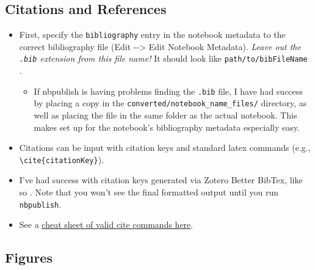 \documentclass[10pt,parskip=half,
	toc=sectionentrywithdots,
	bibliography=totocnumbered,
	captions=tableheading,
    numbers=noendperiod,
    headings=standardclasses]{scrartcl}
\providecommand{\tightlist}{%
  \setlength{\itemsep}{0pt}\setlength{\parskip}{0pt}}
\begin{document}

\subsection{Citations and References}\label{citations-and-references}

\begin{itemize}
\tightlist
\item
  First, specify the \texttt{bibliography} entry in the notebook
  metadata to the correct bibliography file (Edit -\/-\textgreater{}
  Edit Notebook Metadata). \emph{Leave out the \texttt{.bib} extension
  from this file name!} It should look like \texttt{path/to/bibFileName}
  .

  \begin{itemize}
  \tightlist
  \item
    If nbpublish is having problems finding the \texttt{.bib} file, I
    have had success by placing a copy in the
    \texttt{converted/notebook\_name\_files/} directory, as well as
    placing the file in the same folder as the actual notebook. This
    makes set up for the notebook's bibliography metadata especially
    easy.
  \end{itemize}
\item
  Citations can be input with citation keys and standard latex commands
  (e.g., \texttt{\textbackslash{}cite\{citationKey\}}).
\item
  I've had success with citation keys generated via Zotero Better
  BibTex, like so \citep{uddenbergTelefaceSerialReproduction2018}. Note
  that you won't see the final formatted output until you run
  \texttt{nbpublish}.
\item
  See a \href{http://merkel.texture.rocks/Latex/natbib.php}{cheat sheet
  of valid cite commands here}.
\end{itemize}

\subsection{Figures}\label{figures}
\end{document}
